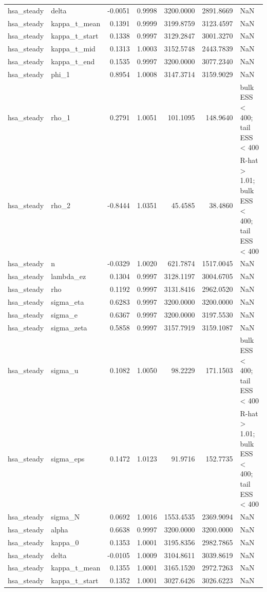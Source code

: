 \begin{tabular}{llrrrrl}
hsa\_steady & delta & -0.0051 & 0.9998 & 3200.0000 & 2891.8669 & NaN \\
hsa\_steady & kappa\_t\_mean & 0.1391 & 0.9999 & 3199.8759 & 3123.4597 & NaN \\
hsa\_steady & kappa\_t\_start & 0.1338 & 0.9997 & 3129.2847 & 3001.3270 & NaN \\
hsa\_steady & kappa\_t\_mid & 0.1313 & 1.0003 & 3152.5748 & 2443.7839 & NaN \\
hsa\_steady & kappa\_t\_end & 0.1535 & 0.9997 & 3200.0000 & 3077.2340 & NaN \\
hsa\_steady & phi\_1 & 0.8954 & 1.0008 & 3147.3714 & 3159.9029 & NaN \\
hsa\_steady & rho\_1 & 0.2791 & 1.0051 & 101.1095 & 148.9640 & bulk ESS < 400; tail ESS < 400 \\
hsa\_steady & rho\_2 & -0.8444 & 1.0351 & 45.4585 & 38.4860 & R-hat > 1.01; bulk ESS < 400; tail ESS < 400 \\
hsa\_steady & n & -0.0329 & 1.0020 & 621.7874 & 1517.0045 & NaN \\
hsa\_steady & lambda\_ez & 0.1304 & 0.9997 & 3128.1197 & 3004.6705 & NaN \\
hsa\_steady & rho & 0.1192 & 0.9997 & 3131.8416 & 2962.0520 & NaN \\
hsa\_steady & sigma\_eta & 0.6283 & 0.9997 & 3200.0000 & 3200.0000 & NaN \\
hsa\_steady & sigma\_e & 0.6367 & 0.9997 & 3200.0000 & 3197.5530 & NaN \\
hsa\_steady & sigma\_zeta & 0.5858 & 0.9997 & 3157.7919 & 3159.1087 & NaN \\
hsa\_steady & sigma\_u & 0.1082 & 1.0050 & 98.2229 & 171.1503 & bulk ESS < 400; tail ESS < 400 \\
hsa\_steady & sigma\_eps & 0.1472 & 1.0123 & 91.9716 & 152.7735 & R-hat > 1.01; bulk ESS < 400; tail ESS < 400 \\
hsa\_steady & sigma\_N & 0.0692 & 1.0016 & 1553.4535 & 2369.9094 & NaN \\
hsa\_steady & alpha & 0.6638 & 0.9997 & 3200.0000 & 3200.0000 & NaN \\
hsa\_steady & kappa\_0 & 0.1353 & 1.0001 & 3195.8356 & 2982.7865 & NaN \\
hsa\_steady & delta & -0.0105 & 1.0009 & 3104.8611 & 3039.8619 & NaN \\
hsa\_steady & kappa\_t\_mean & 0.1355 & 1.0001 & 3165.1520 & 2972.7263 & NaN \\
hsa\_steady & kappa\_t\_start & 0.1352 & 1.0001 & 3027.6426 & 3026.6223 & NaN \\

\end{tabular}
